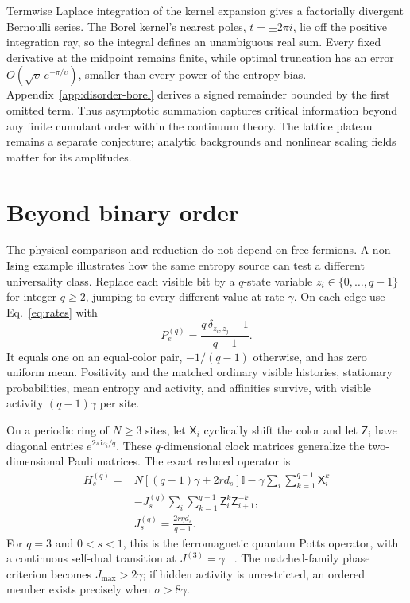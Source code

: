 \documentclass[aps,pre,reprint,amsmath,amssymb,longbibliography,floatfix]{revtex4-2}
\newcommand{\Id}{\mathbb I}
\begin{document}
Termwise Laplace integration of the kernel expansion gives a
factorially divergent Bernoulli series.
The Borel kernel's nearest poles, $t=\pm2\pi i$, lie off the positive integration ray,
so the integral defines an unambiguous real sum. Every fixed derivative
at the midpoint remains finite, while optimal truncation has an error
$O(\sqrt{\upsilon}\,e^{-\pi/\upsilon})$, smaller than every power of the
entropy bias. Appendix~\ref{app:disorder-borel} derives a signed
remainder bounded by the first omitted term. Thus asymptotic summation
captures critical information beyond any finite cumulant order within
the continuum theory. The lattice plateau remains a separate conjecture;
analytic backgrounds and nonlinear scaling fields matter for its amplitudes.

\section{Beyond binary order}
\label{sec:potts}
The physical comparison and reduction do not depend on free fermions.
A non-Ising example illustrates how the same entropy source can test a
different universality class. Replace each visible bit by a $q$-state
variable $z_i\in\{0,\ldots,q-1\}$ for integer $q\geq2$, jumping to every different value
at rate $\gamma$. On each edge use Eq.~\eqref{eq:rates} with
\begin{equation}
 P_e^{(q)}=\frac{q\,\delta_{z_i,z_j}-1}{q-1}.
 \label{eq:Pq}
\end{equation}
It equals one on an equal-color pair, $-1/(q-1)$ otherwise, and has
zero uniform mean. Positivity and the matched ordinary visible histories, stationary
probabilities, mean entropy and activity, and affinities survive,
with visible activity $(q-1)\gamma$ per site.

On a periodic ring of $N\geq3$ sites, let $\mathsf X_i$ cyclically shift
the color and let $\mathsf Z_i$ have diagonal entries
$e^{2\pi\mathrm i z_i/q}$. These $q$-dimensional clock matrices generalize
the two-dimensional Pauli matrices. The exact reduced operator is
\begin{align}
 H_s^{(q)}={}&N\left[(q-1)\gamma+2r d_s\right]\Id
 -\gamma\sum_i\sum_{k=1}^{q-1}\mathsf X_i^k\nonumber\\
 &-J_s^{(q)}\sum_i\sum_{k=1}^{q-1}\mathsf Z_i^k \mathsf Z_{i+1}^{-k},\nonumber\\
 &J_s^{(q)}=\frac{2r\eta d_s}{q-1}.
 \label{eq:pottsH}
\end{align}
For $q=3$ and $0<s<1$, this is the ferromagnetic quantum Potts operator, with a continuous
self-dual transition at $J^{(3)}=\gamma$
~\cite{KarraschSchuricht2017,ZhangSierra2025}. The matched-family phase
criterion becomes $J_{\max}>2\gamma$; if hidden activity is unrestricted,
an ordered member exists precisely when $\sigma>8\gamma$.
\end{document}
